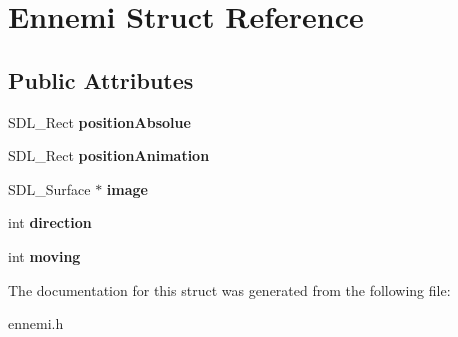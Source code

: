 \hypertarget{structEnnemi}{}\section{Ennemi Struct Reference}
\label{structEnnemi}
\subsection*{Public Attributes}
\begin{DoxyCompactItemize}
\item 
\mbox{\label{structEnnemi_a38314184da044b6e4a8e9f96775bd94c}} 
S\+D\+L\+\_\+\+Rect {\bfseries position\+Absolue}
\item 
\mbox{\label{structEnnemi_a4a74d21ed34168494725b9bf9eb426cd}} 
S\+D\+L\+\_\+\+Rect {\bfseries position\+Animation}
\item 
\mbox{\label{structEnnemi_aaa6f9be660b13c562cc72213abe89c92}} 
S\+D\+L\+\_\+\+Surface $\ast$ {\bfseries image}
\item 
\mbox{\label{structEnnemi_a5fcc1b018d910c113d7f1cf2771fb900}} 
int {\bfseries direction}
\item 
\mbox{\label{structEnnemi_a0ad3911cabc56cbd705d4a19f552c32e}} 
int {\bfseries moving}
\end{DoxyCompactItemize}


The documentation for this struct was generated from the following file\+:\begin{DoxyCompactItemize}
\item 
ennemi.\+h\end{DoxyCompactItemize}
